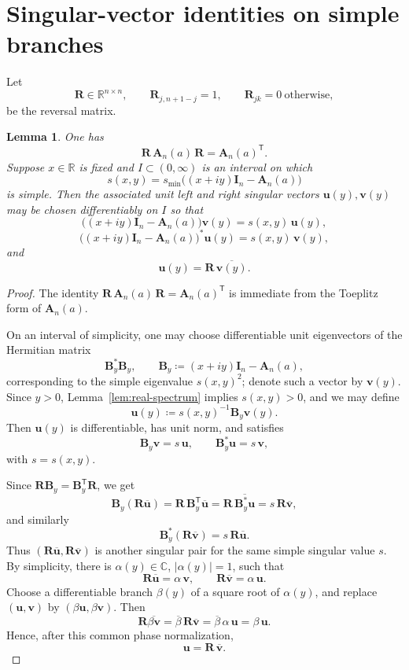 \documentclass[11pt]{article}
\newtheorem{lemma}[theorem]{Lemma}
\begin{document}
\section{Singular-vector identities on simple branches}

Let
\[
\mathbf R\in\mathbb R^{n\times n},
\qquad
\mathbf R_{j,n+1-j}=1,
\qquad
\mathbf R_{jk}=0\ \text{otherwise},
\]
be the reversal matrix.

\begin{lemma}\label{lem:persymmetry}
One has
\[
\mathbf R\,\mathbf A_n(a)\,\mathbf R=\mathbf A_n(a)^{\mathsf T}.
\]
Suppose \(x\in\mathbb R\) is fixed and \(I\subset(0,\infty)\) is an interval on which
\[
s(x,y)=s_{\min}\!\bigl((x+iy)\mathbf I_n-\mathbf A_n(a)\bigr)
\]
is simple. Then the associated unit left and right singular vectors \(\mathbf u(y),\mathbf v(y)\) may be chosen differentiably on \(I\) so that
\[
\bigl((x+iy)\mathbf I_n-\mathbf A_n(a)\bigr)\mathbf v(y)=s(x,y)\,\mathbf u(y),
\]
\[
\bigl((x+iy)\mathbf I_n-\mathbf A_n(a)\bigr)^*\mathbf u(y)=s(x,y)\,\mathbf v(y),
\]
and
\[
\mathbf u(y)=\mathbf R\,\overline{\mathbf v(y)}.
\]
\end{lemma}

\begin{proof}
The identity \(\mathbf R\,\mathbf A_n(a)\,\mathbf R=\mathbf A_n(a)^{\mathsf T}\) is immediate from the Toeplitz form of \(\mathbf A_n(a)\).

On an interval of simplicity, one may choose differentiable unit eigenvectors of the Hermitian matrix
\[
\mathbf B_y^*\mathbf B_y,
\qquad
\mathbf B_y\coloneqq (x+iy)\mathbf I_n-\mathbf A_n(a),
\]
corresponding to the simple eigenvalue \(s(x,y)^2\); denote such a vector by \(\mathbf v(y)\). Since \(y>0\), Lemma~\ref{lem:real-spectrum} implies \(s(x,y)>0\), and we may define
\[
\mathbf u(y)\coloneqq s(x,y)^{-1}\mathbf B_y\mathbf v(y).
\]
Then \(\mathbf u(y)\) is differentiable, has unit norm, and satisfies
\[
\mathbf B_y\mathbf v=s\,\mathbf u,
\qquad
\mathbf B_y^*\mathbf u=s\,\mathbf v,
\]
with \(s=s(x,y)\).

Since \(\mathbf R\mathbf B_y=\mathbf B_y^{\mathsf T}\mathbf R\), we get
\[
\mathbf B_y(\mathbf R\overline{\mathbf u})
=
\mathbf R\,\mathbf B_y^{\mathsf T}\overline{\mathbf u}
=
\mathbf R\,\overline{\mathbf B_y^*\mathbf u}
=
s\,\mathbf R\overline{\mathbf v},
\]
and similarly
\[
\mathbf B_y^*(\mathbf R\overline{\mathbf v})=s\,\mathbf R\overline{\mathbf u}.
\]
Thus \((\mathbf R\overline{\mathbf u},\mathbf R\overline{\mathbf v})\) is another singular pair for the same simple singular value \(s\). By simplicity, there is \(\alpha(y)\in\mathbb C\), \(|\alpha(y)|=1\), such that
\[
\mathbf R\overline{\mathbf u}=\alpha\,\mathbf v,
\qquad
\mathbf R\overline{\mathbf v}=\alpha\,\mathbf u.
\]
Choose a differentiable branch \(\beta(y)\) of a square root of \(\alpha(y)\), and replace \((\mathbf u,\mathbf v)\) by \((\beta\mathbf u,\beta\mathbf v)\). Then
\[
\mathbf R\overline{\beta\mathbf v}
=
\overline{\beta}\,\mathbf R\overline{\mathbf v}
=
\overline{\beta}\,\alpha\,\mathbf u
=
\beta\,\mathbf u.
\]
Hence, after this common phase normalization,
\[
\mathbf u=\mathbf R\,\overline{\mathbf v}.
\]
\end{proof}
\end{document}
